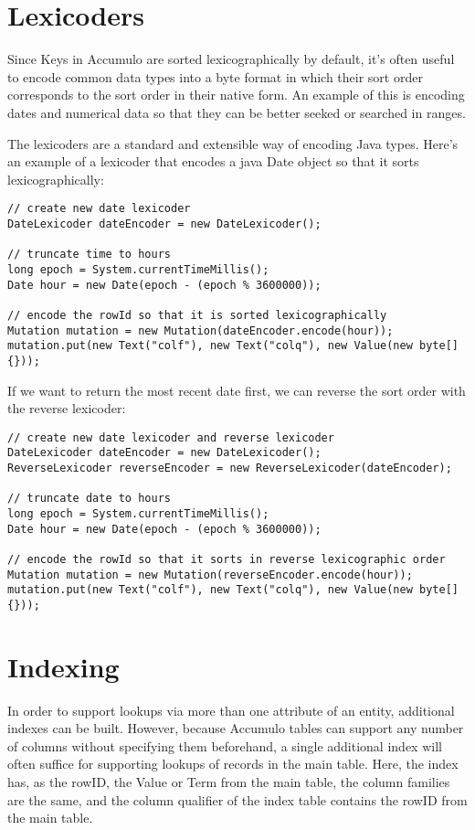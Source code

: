 \section{Lexicoders}
Since Keys in Accumulo are sorted lexicographically by default, it's often useful to encode
common data types into a byte format in which their sort order corresponds to the sort order
in their native form. An example of this is encoding dates and numerical data so that they can
be better seeked or searched in ranges.

The lexicoders are a standard and extensible way of encoding Java types. Here's an example
of a lexicoder that encodes a java Date object so that it sorts lexicographically:

\small
\begin{verbatim}
// create new date lexicoder
DateLexicoder dateEncoder = new DateLexicoder();

// truncate time to hours
long epoch = System.currentTimeMillis();
Date hour = new Date(epoch - (epoch % 3600000));

// encode the rowId so that it is sorted lexicographically
Mutation mutation = new Mutation(dateEncoder.encode(hour));
mutation.put(new Text("colf"), new Text("colq"), new Value(new byte[]{}));
\end{verbatim}
\normalsize

If we want to return the most recent date first, we can reverse the sort order
with the reverse lexicoder:

\small
\begin{verbatim}
// create new date lexicoder and reverse lexicoder
DateLexicoder dateEncoder = new DateLexicoder();
ReverseLexicoder reverseEncoder = new ReverseLexicoder(dateEncoder);

// truncate date to hours
long epoch = System.currentTimeMillis();
Date hour = new Date(epoch - (epoch % 3600000));

// encode the rowId so that it sorts in reverse lexicographic order
Mutation mutation = new Mutation(reverseEncoder.encode(hour));
mutation.put(new Text("colf"), new Text("colq"), new Value(new byte[]{}));
\end{verbatim}
\normalsize


\section{Indexing}
In order to support lookups via more than one attribute of an entity, additional
indexes can be built. However, because Accumulo tables can support any number of
columns without specifying them beforehand, a single additional index will often
suffice for supporting lookups of records in the main table. Here, the index has, as
the rowID, the Value or Term from the main table, the column families are the same,
and the column qualifier of the index table contains the rowID from the main table.

